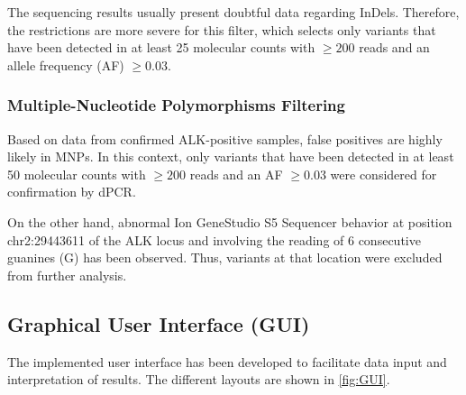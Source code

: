 The sequencing results usually present doubtful data regarding InDels. Therefore, the restrictions are more severe for this filter, which selects only variants that have been detected in at least 25 molecular counts with $\ge 200$ reads and an allele frequency (AF) $\ge 0.03$.

\subsubsection{Multiple-Nucleotide Polymorphisms Filtering}

Based on data from confirmed ALK-positive samples, false positives are highly likely in MNPs. In this context, only variants that have been detected in at least 50 molecular counts with $\ge 200$ reads and an AF $\ge 0.03$ were considered for confirmation by dPCR. 

On the other hand, abnormal Ion GeneStudio\texttrademark{} S5 Sequencer behavior at position chr2:29443611 of the ALK locus and involving the reading of 6 consecutive guanines (G) has been observed. Thus, variants at that location were excluded from further analysis.

\subsection{Graphical User Interface (GUI)}

The implemented user interface has been developed to facilitate data input and interpretation of results. The different layouts are shown in \autoref{fig:GUI}.

